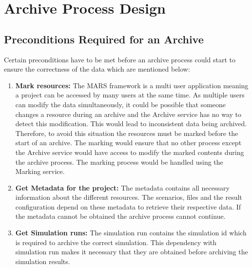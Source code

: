 \section{Archive Process Design}
\subsection{Preconditions Required for an Archive}
Certain preconditions have to be met before an archive process could start to ensure the correctness of the data which are mentioned below:
\begin{enumerate}
    \label{lst:preconditionsArchive}
    \item \textbf{Mark resources:} The MARS framework is a multi user application meaning a project can be accessed by many users at the same time. 
    As multiple users can modify the data simultaneously, it could be possible that someone changes a resource during an archive and the 
    Archive service has no way to detect this modification. This would lead to inconsistent data being archived.
    Therefore, to avoid this situation the resources must be marked before the start of an archive. The marking would ensure that no other process except the Archive
    service would have access to modify the marked contents during the archive process. The marking process would be handled using the Marking service.
    \item \textbf{Get Metadata for the project:} The metadata contains all necessary information about
    the different resources. The scenarios, files and the result configuration depend on these metadata
    to retrieve their respective data. If the metadata cannot be obtained the archive process cannot continue.
    \item \textbf{Get Simulation runs:} The simulation run contains the simulation id which is required to archive the correct simulation. This dependency
    with simulation run makes it necessary that they are obtained before archiving the simulation results.
\end{enumerate}

